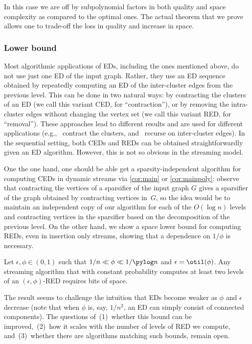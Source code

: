 \noindent
In this case we are off by subpolynomial factors in both quality and space complexity as compared to the optimal ones. The actual theorem that we prove allows one to trade-off the loss in quality and increase in space.

\subsubsection*{Lower bound}
Most algorithmic applications of EDs, including the ones mentioned above, do not use just one ED of the input graph. Rather, they use an ED sequence obtained by repeatedly computing an ED of the inter-cluster edges from the previous level. This can be done in two natural ways: by contracting the clusters of an ED (we call this variant CED, for “contraction”), or by removing the intra-cluster edges without changing the vertex set (we call this variant RED, for “removal”). These approaches lead to different results and are used for different applications (e.g.,~\cite{boundlink,mincutjli} contract the clusters, and~\cite{stspectral, maxflow} recurse on inter-cluster edges). In the sequential setting, both CEDs and REDs can be obtained straightforwardly given an ED algorithm. However, this is not so obvious in the streaming model.

One the one hand, one should be able get a sparsity-independent algorithm for computing CEDs in dynamic streams via \cref{cor:main} or \cref{cor:mainpoly}: observe that contracting the vertices of a sparsifier of the input graph $G$  gives a sparsifier of the graph obtained by contracting vertices in~$G$, so the idea would be to maintain an independent copy of our algorithm for each of the $O(\log n)$ levels and contracting vertices in the sparsifier based on the decomposition of the previous level. On the other hand, we show a space lower bound for computing REDs, even in insertion only streams, showing that a dependence on $1/\phi$ is necessary.

\begin{mainthsimple}
	\label{th:lbsimple}
	Let $\epsilon,\phi \in (0,1)$ such that $1/n \ll \phi \ll 1/\pylog n$ and $ \epsilon =\otil( \phi)$. Any streaming algorithm that with constant probability computes at least two levels of an $(\epsilon,\phi)$-RED requires  bits of space.
\end{mainthsimple}

\noindent
The result seems to challenge the intuition that EDs become weaker as $\phi$ and $\epsilon$ decrease (note that when $\phi$ is, say, $1/n^2$, an ED can simply consist of connected components). The questions of~(1)~whether this bound can be improved,~(2)~how it scales with the number of levels of RED we compute, and~(3)~whether there are algorithms matching such bounds, remain open.